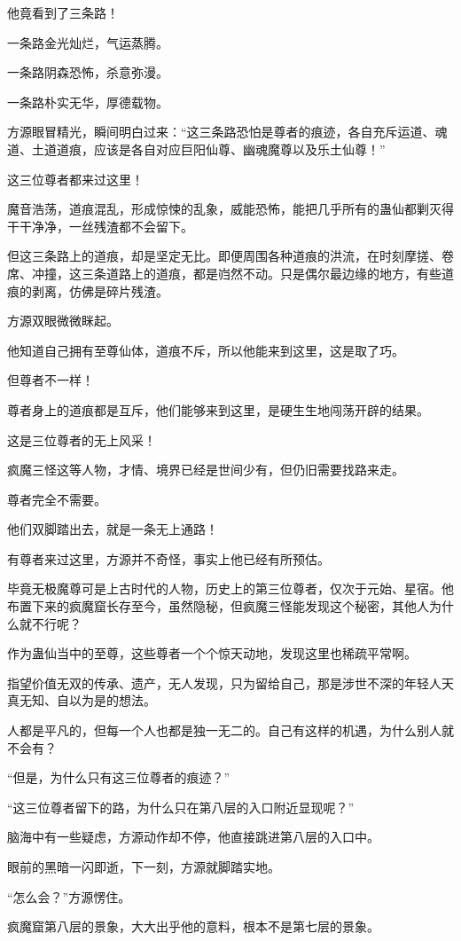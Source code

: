 \begin{this_body}
他竟看到了三条路！

一条路金光灿烂，气运蒸腾。

一条路阴森恐怖，杀意弥漫。

一条路朴实无华，厚德载物。

方源眼冒精光，瞬间明白过来：“这三条路恐怕是尊者的痕迹，各自充斥运道、魂道、土道道痕，应该是各自对应巨阳仙尊、幽魂魔尊以及乐土仙尊！”

这三位尊者都来过这里！

魔音浩荡，道痕混乱，形成惊悚的乱象，威能恐怖，能把几乎所有的蛊仙都剿灭得干干净净，一丝残渣都不会留下。

但这三条路上的道痕，却是坚定无比。即便周围各种道痕的洪流，在时刻摩搓、卷席、冲撞，这三条道路上的道痕，都是岿然不动。只是偶尔最边缘的地方，有些道痕的剥离，仿佛是碎片残渣。

方源双眼微微眯起。

他知道自己拥有至尊仙体，道痕不斥，所以他能来到这里，这是取了巧。

但尊者不一样！

尊者身上的道痕都是互斥，他们能够来到这里，是硬生生地闯荡开辟的结果。

这是三位尊者的无上风采！

疯魔三怪这等人物，才情、境界已经是世间少有，但仍旧需要找路来走。

尊者完全不需要。

他们双脚踏出去，就是一条无上通路！

有尊者来过这里，方源并不奇怪，事实上他已经有所预估。

毕竟无极魔尊可是上古时代的人物，历史上的第三位尊者，仅次于元始、星宿。他布置下来的疯魔窟长存至今，虽然隐秘，但疯魔三怪能发现这个秘密，其他人为什么就不行呢？

作为蛊仙当中的至尊，这些尊者一个个惊天动地，发现这里也稀疏平常啊。

指望价值无双的传承、遗产，无人发现，只为留给自己，那是涉世不深的年轻人天真无知、自以为是的想法。

人都是平凡的，但每一个人也都是独一无二的。自己有这样的机遇，为什么别人就不会有？

“但是，为什么只有这三位尊者的痕迹？”

“这三位尊者留下的路，为什么只在第八层的入口附近显现呢？”

脑海中有一些疑虑，方源动作却不停，他直接跳进第八层的入口中。

眼前的黑暗一闪即逝，下一刻，方源就脚踏实地。

“怎么会？”方源愣住。

疯魔窟第八层的景象，大大出乎他的意料，根本不是第七层的景象。

\end{this_body}

